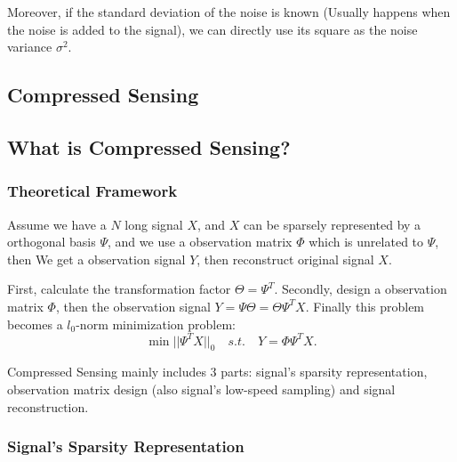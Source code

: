 \documentclass[12pt]{ctexart}
\begin{document}
Moreover, if the standard deviation of the noise is known (Usually happens when the
noise is added to the signal), we can directly use its square as the noise variance
$\sigma^2$.

\newpage
\thispagestyle{empty}
\begin{center}
    \vspace*{96pt}
    \fontsize{60}{60}\par
    \fontsize{26}{31.2}\section{\textbf{Compressed Sensing}}\par %
    \vspace{25pt}
    \fontsize{18}{21.6}\par %
    \vfill
\end{center}

\newpage
\subsection{\textbf{What is Compressed Sensing?}}

\subsubsection{\textbf{Theoretical Framework}}

Assume we have a $N$ long signal $X$, and $X$ can be sparsely represented by a orthogonal
basis $\Psi$, and we use a observation matrix $\Phi$ which is unrelated to $\Psi$, then We
get a observation signal $Y$, then reconstruct original signal $X$.

First, calculate the transformation factor $\Theta = \Psi^T$. Secondly, design a observation
matrix $\Phi$, then the observation signal $Y = \Psi \Theta = \Theta \Psi^T X$. Finally
this problem becomes a $l_0$-norm minimization problem:
\[
\min ||\Psi^T X||_0 \quad s.t. \quad Y = \Phi \Psi^T X.
\]

Compressed Sensing mainly includes 3 parts: signal's sparsity representation, observation
matrix design (also signal's low-speed sampling) and signal reconstruction.

\subsubsection{\textbf{Signal's Sparsity Representation}}
\end{document}
